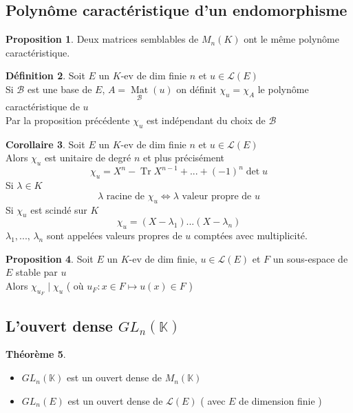 \documentclass[10pt,a4paper]{article}
\theoremstyle{definition}
\newtheorem{proposition}{Proposition}[section]
\newtheorem{theorem}[proposition]{Théorème}
\newtheorem{corollaire}[proposition]{Corollaire}
\newtheorem{definition}[proposition]{Définition}
\DeclareMathOperator*{\mat}{Mat}
\DeclareMathOperator{\Tr}{Tr}
\begin{document}
\subsection{Polynôme caractéristique d'un endomorphisme}
\begin{proposition}
Deux matrices semblables de $M_n(K)$ ont le même polynôme caractéristique.
\end{proposition}
\begin{definition}
Soit $E$ un $K$-ev de dim finie $n$ et $u \in \mathcal{L}(E)$ \\
Si $\mathcal{B}$ est une base de $E$, $A = \mat\limits_\mathcal{B}(u)$ on définit $\chi_u = \chi_A$ le polynôme caractéristique de $u$ \\
Par la proposition précédente $\chi_u$ est indépendant du choix de $\mathcal{B}$
\end{definition}

\pagebreak

\begin{corollaire}
Soit $E$ un $K$-ev de dim finie $n$ et $u \in \mathcal{L}(E)$ \\
Alors $\chi_u$ est unitaire de degré $n$ et plus précisément
\[ \chi_u = X^n - \Tr X^{n - 1} + ... + (-1)^n \det u \]
Si $\lambda \in K$
\[ \lambda \text{ racine de } \chi_u \iff \lambda \text{ valeur propre de } u \]
Si $\chi_u$ est scindé sur $K$
\[ \chi_u = (X - \lambda_1) ... (X - \lambda_n) \]
$\lambda_1, ...,\, \lambda_n$ sont appelées valeurs propres de $u$ comptées avec multiplicité.
\end{corollaire}
\begin{proposition}
Soit $E$ un $K$-ev de dim finie, $u \in \mathcal{L}(E)$ et $F$ un sous-espace de $E$ stable par $u$ \\
Alors $\chi_{u_F} \mid \chi_u$ ( où $u_F : x \in F \mapsto u(x) \in F$ )
\end{proposition}

\subsection{L'ouvert dense $GL_n(\mathbb{K})$}
\begin{theorem}
\hfill
\begin{itemize}
\item $GL_n(\mathbb{K})$ est un ouvert dense de $M_n(\mathbb{K})$
\item $GL_n(E)$ est un ouvert dense de $\mathcal{L}(E)$ ( avec $E$ de dimension finie )
\end{itemize}
\end{theorem}
\end{document}

